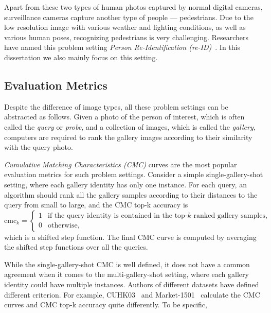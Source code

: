 Apart from these two types of human photos captured by normal digital cameras, surveillance cameras capture another type of people --- pedestrians. Due to the low resolution image with various weather and lighting conditions, as well as various human poses, recognizing pedestrians is very challenging. Researchers have named this problem setting \emph{Person Re-Identification (re-ID)}~\cite{zajdel2005keeping}. In this dissertation we also mainly focus on this setting.

\subsection{Evaluation Metrics} %
\label{sub:human-id-eval-metrics}
Despite the difference of image types, all these problem settings can be abstracted as follows. Given a photo of the person of interest, which is often called the \emph{query} or \emph{probe}, and a collection of images, which is called the \emph{gallery}, computers are required to rank the gallery images according to their similarity with the query photo.

\emph{Cumulative Matching Characteristics (CMC)} curves are the most popular evaluation metrics for such problem settings. Consider a simple single-gallery-shot setting, where each gallery identity has only one instance. For each query, an algorithm should rank all the gallery samples according to their distances to the query from small to large, and the CMC top-k accuracy is
\begin{equation}
  \mathrm{cmc}_k = \begin{cases}
    1 & \text{if the query identity is contained in the top-$k$ ranked gallery samples,} \\
    0 & \text{otherwise},
  \end{cases}
\end{equation}
which is a shifted step function. The final CMC curve is computed by averaging the shifted step functions over all the queries.

While the single-gallery-shot CMC is well defined, it does not have a common agreement when it comes to the multi-gallery-shot setting, where each gallery identity could have multiple instances. Authors of different datasets have defined different criterion. For example, CUHK03~\cite{li2014deepreid} and Market-1501~\cite{zheng2015scalable} calculate the CMC curves and CMC top-k accuracy quite differently. To be specific,

